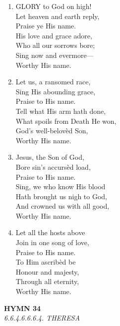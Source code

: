 \begin{enumerate}
    \item GLORY to God on high! \\
        Let heaven and earth reply, \\
        Praise ye His name. \\
        His love and grace adore, \\
        Who all our sorrows bore; \\
        Sing now and evermore--- \\
        Worthy His name.

    \item Let us, a ransomed race, \\
        Sing His abounding grace, \\
        Praise to His name. \\
        Tell what His arm hath done, \\
        What spoils from Death He won, \\
        God's well-belov\`ed Son, \\
        Worthy His name.

    \item Jesus, the Son of God, \\
        Bore sin's accurs\`ed load, \\
        Praise to His name. \\
        Sing, we who know His blood \\
        Hath brought us nigh to God, \\
        And crowned us with all good, \\
        Worthy His name.

    \item Let all the hosts above \\
        Join in one song of love, \\
        Praise to His name. \\
        To Him ascrib\`ed be \\
        Honour and majesty, \\
        Through all eternity, \\
        Worthy His name.

\end{enumerate}

\newpage
\begin{center}
    {\Large \textbf{HYMN 34}}
    \\
    \textit{6.6.4.6.6.6.4. THERESA}
\end{center}
\vspace{1em}

